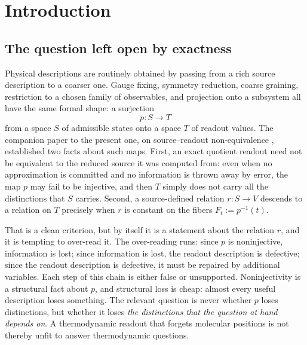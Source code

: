 \documentclass[11pt,reqno]{amsart}
\theoremstyle{plain}
\theoremstyle{definition}
\newcommand{\Src}{S}
\newcommand{\Rdt}{T}
\begin{document}
\maketitle

\section{Introduction}\label{sec:intro}

\subsection{The question left open by exactness}

Physical descriptions are routinely obtained by passing from a rich source description to a
coarser one. Gauge fixing, symmetry reduction, coarse graining, restriction to a chosen family
of observables, and projection onto a subsystem all have the same formal shape: a surjection
\begin{equation}\label{eq:readout-intro}
p\colon\Src\longrightarrow\Rdt
\end{equation}
from a space $\Src$ of admissible states onto a space $\Rdt$ of readout values. The companion
paper to the present one, on source--readout non-equivalence \cite{ShadowI}, established two
facts about such maps. First, an exact quotient readout need not be equivalent to the reduced
source it was computed from: even when no approximation is committed and no information is
thrown away by error, the map $p$ may fail to be injective, and then $\Rdt$ simply does not
carry all the distinctions that $\Src$ carries. Second, a source-defined relation
$r\colon\Src\to V$ descends to a relation on $\Rdt$ precisely when $r$ is constant on the fibers
$F_t:=p^{-1}(t)$.

That is a clean criterion, but by itself it is a statement about the relation $r$, and it is
tempting to over-read it. The over-reading runs: since $p$ is noninjective, information is lost;
since information is lost, the readout description is defective; since the readout description
is defective, it must be repaired by additional variables. Each step of this chain is either
false or unsupported. Noninjectivity is a structural fact about $p$, and structural loss is
cheap: almost every useful description loses something. The relevant question is never whether
$p$ loses distinctions, but whether it loses \emph{the distinctions that the question at hand
depends on}. A thermodynamic readout that forgets molecular positions is not thereby unfit to
answer thermodynamic questions.
\end{document}
